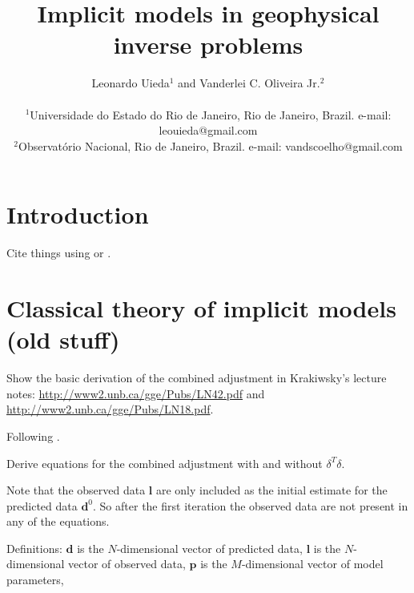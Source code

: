 \documentclass[onecolumn]{article}
\begin{document}
\title{Implicit models in geophysical inverse problems}
\author{
    Leonardo Uieda$^{1}$
    and
    Vanderlei C. Oliveira Jr.$^{2}$
    \\\\
    {\small $^1$Universidade do Estado do Rio de Janeiro, Rio de Janeiro, Brazil.
        e-mail: leouieda@gmail.com}
    \\
    {\small $^2$Observatório Nacional, Rio de Janeiro, Brazil.
        e-mail: vandscoelho@gmail.com}
}


\maketitle


\begin{abstract}
    \lipsum[1]
\end{abstract}


\section{Introduction}

Cite things using \citet{tikhonov1977} or \citep{tikhonov1977}.



\section{Classical theory of implicit models (old stuff)}

Show the basic derivation of the combined adjustment in Krakiwsky's lecture
notes:
\url{http://www2.unb.ca/gge/Pubs/LN42.pdf} and
\url{http://www2.unb.ca/gge/Pubs/LN18.pdf}.

Following \citet{vanicek1986}.

Derive equations for the combined adjustment with and without $\delta^T\delta$.

Note that the observed data $\mathbf{l}$
are only included
as the initial estimate
for the predicted data $\mathbf{d}^0$.
So after the first iteration
the observed data are not present
in any of the equations.

Definitions:
$\mathbf{d}$ is the $N$-dimensional vector of predicted data,
$\mathbf{l}$ is the $N$-dimensional vector of observed data,
$\mathbf{p}$ is the $M$-dimensional vector of model parameters,
\end{document}
